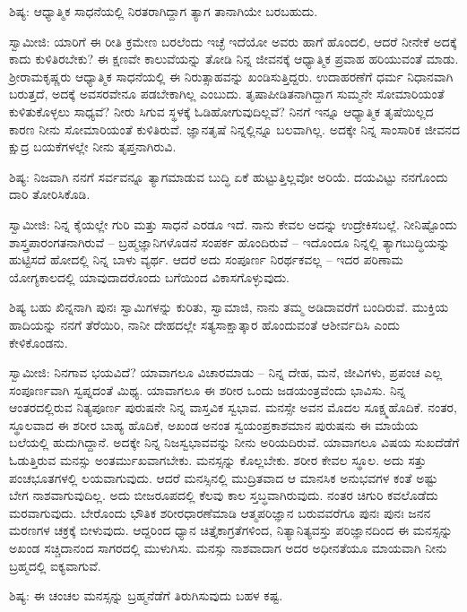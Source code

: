 ಶಿಷ್ಯ: ಆಧ್ಯಾತ್ಮಿಕ ಸಾಧನೆಯಲ್ಲಿ ನಿರತರಾಗಿದ್ದಾಗ ತ್ಯಾಗ ತಾನಾಗಿಯೇ ಬರಬಹುದು.

ಸ್ವಾಮೀಜಿ: ಯಾರಿಗೆ ಈ ರೀತಿ ಕ್ರಮೇಣ ಬರಲೆಂದು ಇಚ್ಛೆ ಇದೆಯೋ ಅವರು ಹಾಗೆ ಹೊಂದಲಿ, ಆದರೆ ನೀನೇಕೆ ಅದಕ್ಕೆ ಕಾದು ಕುಳಿತಿರಬೇಕು? ಈ ಕ್ಷಣವೇ ಕಾಲುವೆಯನ್ನು ತೋಡಿ ನಿನ್ನ ಜೀವನಕ್ಕೆ ಆಧ್ಯಾತ್ಮಿಕ ಪ್ರವಾಹ ಹರಿಯುವಂತೆ ಮಾಡು. ಶ‍್ರೀರಾಮಕೃಷ್ಣರು ಆಧ್ಯಾತ್ಮಿಕ ಸಾಧನೆಯಲ್ಲಿ ಈ ನಿರುತ್ಸಾಹವನ್ನು ಖಂಡಿಸುತ್ತಿದ್ದರು. ಉದಾಹರಣೆಗೆ ಧರ್ಮ ನಿಧಾನವಾಗಿ ಬರುತ್ತದೆ, ಅದಕ್ಕೆ ಅವಸರವೇನೂ ಪಡಬೇಕಾಗಿಲ್ಲ ಎಂಬುದು. ತೃಷಾಪೀಡಿತನಾಗಿದ್ದಾಗ ಸುಮ್ಮನೇ ಸೋಮಾರಿಯಂತೆ ಕುಳಿತುಕೊಳ್ಳಲು ಸಾಧ್ಯವೆ? ನೀರು ಸಿಗುವ ಸ್ಥಳಕ್ಕೆ ಓಡಿಹೋಗುವುದಿಲ್ಲವೆ? ನಿನಗೆ ಇನ್ನೂ ಆಧ್ಯಾತ್ಮಿಕ ತೃಷೆಯಿಲ್ಲದ ಕಾರಣ ನೀನು ಸೋಮಾರಿಯಂತೆ ಕುಳಿತಿರುವೆ. ಜ್ಞಾನತೃಷೆ ನಿನ್ನಲ್ಲಿನ್ನೂ ಬಲವಾಗಿಲ್ಲ. ಅದಕ್ಕೇ ನಿನ್ನ ಸಾಂಸಾರಿಕ ಜೀವನದ ಕ್ಷುದ್ರ ಬಯಕೆಗಳಲ್ಲೇ ನೀನು ತೃಪ್ತನಾಗಿರುವಿ.

ಶಿಷ್ಯ: ನಿಜವಾಗಿ ನನಗೆ ಸರ್ವವನ್ನೂ ತ್ಯಾಗಮಾಡುವ ಬುದ್ಧಿ ಏಕೆ ಹುಟ್ಟುತ್ತಿಲ್ಲವೋ ಅರಿಯೆ. ದಯವಿಟ್ಟು ನನಗೊಂದು ದಾರಿ ತೋರಿಸಿಕೊಡಿ.

ಸ್ವಾಮೀಜಿ: ನಿನ್ನ ಕೈಯಲ್ಲೇ ಗುರಿ ಮತ್ತು ಸಾಧನೆ ಎರಡೂ ಇದೆ. ನಾನು ಕೇವಲ ಅದನ್ನು ಉದ್ರೇಕಿಸಬಲ್ಲೆ. ನೀನಿಷ್ಟೊಂದು ಶಾಸ್ತ್ರಪಾರಂಗತನಾಗಿರುವೆ – ಬ್ರಹ್ಮಜ್ಞಾನಿಗಳೊಡನೆ ಸಂಪರ್ಕ ಹೊಂದಿರುವೆ – ಇದೊಂದೂ ನಿನ್ನಲ್ಲಿ ತ್ಯಾಗಬುದ್ಧಿಯನ್ನು ಹುಟ್ಟಿಸದೆ ಹೋದಲ್ಲಿ ನಿನ್ನ ಬಾಳು ವ್ಯರ್ಥ. ಆದರೆ ಅದು ಸಂಪೂರ್ಣ ನಿರರ್ಥಕವಲ್ಲ – ಇದರ ಪರಿಣಾಮ ಯೋಗ್ಯಕಾಲದಲ್ಲಿ ಯಾವುದಾದರೊಂದು ಬಗೆಯಿಂದ ವಿಕಾಸಗೊಳ್ಳುವುದು.

ಶಿಷ್ಯ ಬಹು ಖಿನ್ನನಾಗಿ ಪುನಃ ಸ್ವಾಮಿಗಳನ್ನು ಕುರಿತು, ಸ್ವಾಮಾಜಿ, ನಾನು ತಮ್ಮ ಅಡಿದಾವರೆಗೆ ಬಂದಿರುವೆ. ಮುಕ್ತಿಯ ಹಾದಿಯನ್ನು ನನಗೆ ತೆರೆಯಿರಿ, ನಾನೀ ದೇಹದಲ್ಲೇ ಸತ್ಯಸಾಕ್ಷಾತ್ಕಾರ ಹೊಂದುವಂತೆ ಆಶೀರ್ವದಿಸಿ ಎಂದು ಕೇಳಿಕೊಂಡನು.

ಸ್ವಾಮೀಜಿ: ನಿನಗಾವ ಭಯವಿದೆ? ಯಾವಾಗಲೂ ವಿಚಾರಮಾಡು – ನಿನ್ನ ದೇಹ, ಮನೆ, ಜೀವಿಗಳು, ಪ್ರಪಂಚ ಎಲ್ಲ ಸಂಪೂರ್ಣವಾಗಿ ಸ್ವಪ್ನದಂತೆ ಮಿಥ್ಯ. ಯಾವಾಗಲೂ ಈ ಶರೀರ ಒಂದು ಜಡಯಂತ್ರವೆಂದು ಭಾವಿಸು. ನಿನ್ನ ಆಂತರದಲ್ಲಿರುವ ನಿತ್ಯಪೂರ್ಣ ಪುರುಷನೇ ನಿನ್ನ ವಾಸ್ತವಿಕ ಸ್ವಭಾವ. ಮನಸ್ಸೇ ಅವನ ಮೊದಲ ಸೂಕ್ಷ್ಮಹೊದಿಕೆ. ನಂತರ, ಸ್ಥೂಲವಾದ ಈ ಶರೀರ ಬಾಹ್ಯ ಹೊದಿಕೆ, ಅಖಂಡ ಅನಂತ ಸ್ವಯಂಪ್ರಕಾಶಮಾನ ಪುರುಷನು ಈ ಮಾಯೆಯ ಬಲೆಯಲ್ಲಿ ಹುದುಗಿದ್ದಾನೆ. ಅದಕ್ಕೇ ನಿನ್ನ ನಿಜಸ್ವಭಾವವನ್ನು ನೀನು ಅರಿಯದಿರುವೆ. ಯಾವಾಗಲೂ ವಿಷಯ ಸುಖದೆಡೆಗೆ ಓಡುತ್ತಿರುವ ಮನಸ್ಸು ಅಂತರ್ಮುಖವಾಗಬೇಕು. ಮನಸ್ಸನ್ನು ಕೊಲ್ಲಬೇಕು. ಶರೀರ ಕೇವಲ ಸ್ಥೂಲ. ಅದು ಸತ್ತು ಪಂಚಭೂತಗಳಲ್ಲಿ ಲಯವಾಗುವುದು. ಆದರೆ ಮನಸ್ಸಿನಲ್ಲಿ ಮುದ್ರಿತವಾದ ಆ ಮಾನಸಿಕ ಅನುಭವಗಳ ಕಂತೆ ಅಷ್ಟು ಬೇಗ ನಾಶವಾಗುವುದಿಲ್ಲ. ಅದು ಬೀಜರೂಪದಲ್ಲಿ ಕೆಲವು ಕಾಲ ಸ್ತಬ್ಧವಾಗಿರುವುದು. ನಂತರ ಚಿಗುರಿ ಕವಲೊಡೆದು ಮರವಾಗುವುದು. ಬೇರೊಂದು ಭೌತಿಕ ಶರೀರಧಾರಣೆಮಾಡಿ ಆತ್ಮಪರಿಜ್ಞಾನ ಬರುವವರೆಗೂ ಪುನಃ ಪುನಃ ಜನನ ಮರಣಗಳ ಚಕ್ರಕ್ಕೆ ಬೀಳುವುದು. ಆದ್ದರಿಂದ ಧ್ಯಾನ ಚಿತ್ತೈಕಾಗ್ರತೆಗಳಿಂದ, ನಿತ್ಯಾನಿತ್ಯವಸ್ತು ಪರಿಜ್ಞಾನದಿಂದ ಈ ಮನಸ್ಸನ್ನು ಅಖಂಡ ಸಚ್ಚಿದಾನಂದ ಸಾಗರದಲ್ಲಿ ಮುಳುಗಿಸು. ಮನಸ್ಸು ನಾಶವಾದಾಗ ಅದರ ಅಧೀನತೆಯೂ ಮಾಯವಾಗಿ ನೀನು ಬ್ರಹ್ಮದಲ್ಲಿ ಐಕ್ಯವಾಗುವೆ.

ಶಿಷ್ಯ: ಈ ಚಂಚಲ ಮನಸ್ಸನ್ನು ಬ್ರಹ್ಮನೆಡೆಗೆ ತಿರುಗಿಸುವುದು ಬಹಳ ಕಷ್ಟ.

